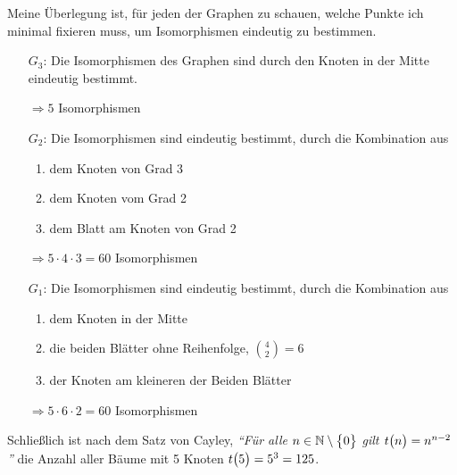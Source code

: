 \documentclass{scrreprt}
\begin{document}
Meine Überlegung ist, für jeden der Graphen zu schauen, welche Punkte ich
minimal fixieren muss, um Isomorphismen eindeutig zu bestimmen.
\begin{itemize}
\item[$G_3$:] Die Isomorphismen des Graphen sind durch den Knoten in der Mitte
  eindeutig bestimmt.

  $\Rightarrow 5$ Isomorphismen

\item[$G_2$:] Die Isomorphismen sind eindeutig bestimmt, durch die Kombination
  aus
  \begin{enumerate}[(1)]
  \item dem Knoten von Grad 3
  \item dem Knoten vom Grad 2
  \item dem Blatt am Knoten von Grad 2
  \end{enumerate}

  $\Rightarrow 5 \cdot 4 \cdot 3 = 60$ Isomorphismen

\item[$G_1$:] Die Isomorphismen sind eindeutig bestimmt, durch die Kombination
  aus
  \begin{enumerate}[(1)]
  \item dem Knoten in der Mitte
  \item die beiden Blätter ohne Reihenfolge, $\binom{4}{2} = 6$
  \item der Knoten am kleineren der Beiden Blätter
  \end{enumerate}

  $\Rightarrow 5 \cdot 6 \cdot 2 = 60$ Isomorphismen
\end{itemize}

Schließlich ist nach dem Satz von Cayley, \emph{``Für alle
  $n \in \mathbb{N} \setminus \qty\big{0}$ gilt $t\qty\big(n) = n^{n - 2}$''}
die Anzahl aller Bäume mit 5 Knoten $t\qty\big(5) = 5^3 = 125$.

\newpage
\end{document}
